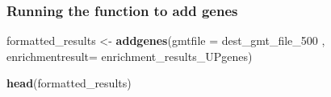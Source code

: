 \documentclass[
]{book}
\newenvironment{Shaded}{\begin{snugshade}}{\end{snugshade}}
\newcommand{\AttributeTok}[1]{\textcolor[rgb]{0.13,0.29,0.53}{#1}}
\newcommand{\FunctionTok}[1]{\textcolor[rgb]{0.13,0.29,0.53}{\textbf{#1}}}
\newcommand{\NormalTok}[1]{#1}
\newcommand{\OtherTok}[1]{\textcolor[rgb]{0.56,0.35,0.01}{#1}}
\begin{document}
\subsubsection{Running the function to add genes}\label{running-the-function-to-add-genes}

\begin{Shaded}
\begin{Highlighting}[]
\NormalTok{formatted\_results }\OtherTok{\textless{}{-}} \FunctionTok{addgenes}\NormalTok{(}\AttributeTok{gmtfile =}\NormalTok{ dest\_gmt\_file\_500 , }\AttributeTok{enrichmentresult=}\NormalTok{ enrichment\_results\_UPgenes)}

\FunctionTok{head}\NormalTok{(formatted\_results)}
\end{Highlighting}
\end{Shaded}
\end{document}
